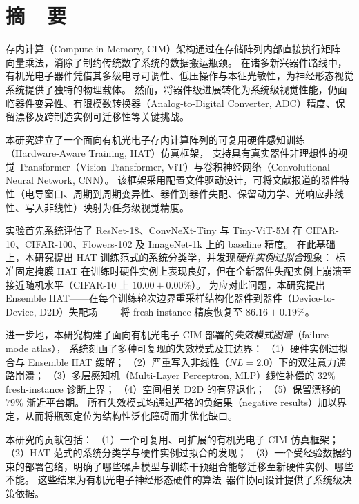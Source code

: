 
\chapter*{摘\ \ 要}

存内计算（Compute-in-Memory, CIM）架构通过在存储阵列内部直接执行矩阵--向量乘法，消除了制约传统数字系统的数据搬运瓶颈。
在诸多新兴器件路线中，有机光电子器件凭借其多级电导可调性、低压操作与本征光敏性，为神经形态视觉系统提供了独特的物理载体。
然而，将器件级进展转化为系统级视觉性能，仍面临器件变异性、有限模数转换器（Analog-to-Digital Converter, ADC）精度、保留漂移及跨制造实例可迁移性等关键挑战。

本研究建立了一个面向有机光电子存内计算阵列的可复用硬件感知训练（Hardware-Aware Training, HAT）仿真框架，
支持具有真实器件非理想性的视觉 Transformer（Vision Transformer, ViT）与卷积神经网络（Convolutional Neural Network, CNN）。
该框架采用配置文件驱动设计，可将文献报道的器件特性（电导窗口、周期到周期变异性、器件到器件失配、保留动力学、光响应非线性、写入非线性）映射为任务级视觉精度。

实验首先系统评估了 ResNet-18、ConvNeXt-Tiny 与 Tiny-ViT-5M 在 CIFAR-10、CIFAR-100、Flowers-102 及 ImageNet-1k 上的 baseline 精度。
在此基础上，本研究提出 HAT 训练范式的系统分类学，并发现\emph{硬件实例过拟合}现象：
标准固定掩膜 HAT 在训练时硬件实例上表现良好，但在全新器件失配实例上崩溃至接近随机水平（CIFAR-10 上 $10.00\pm0.00\%$）。
为应对此问题，本研究提出 Ensemble HAT——在每个训练轮次边界重采样结构化器件到器件（Device-to-Device, D2D）失配场——
将 fresh-instance 精度恢复至 $86.16\pm0.19\%$。

进一步地，本研究构建了面向有机光电子 CIM 部署的\emph{失效模式图谱}（failure mode atlas），
系统刻画了多种可复现的失效模式及其边界：
（1）硬件实例过拟合与 Ensemble HAT 缓解；
（2）严重写入非线性（$NL=2.0$）下的双注意力通路崩溃；
（3）多层感知机（Multi-Layer Perceptron, MLP）线性补偿的 $32\%$ fresh-instance 诊断上界；
（4）空间相关 D2D 的有界退化；
（5）保留漂移的 $79\%$ 渐近平台期。
所有失效模式均通过严格的负结果（negative results）加以界定，从而将瓶颈定位为结构性泛化障碍而非优化缺口。

本研究的贡献包括：
（1）一个可复用、可扩展的有机光电子 CIM 仿真框架；
（2）HAT 范式的系统分类学与硬件实例过拟合的发现；
（3）一个受经验数据约束的部署包络，明确了哪些噪声模型与训练干预组合能够迁移至新硬件实例、哪些不能。
这些结果为有机光电子神经形态硬件的算法--器件协同设计提供了系统级决策依据。

